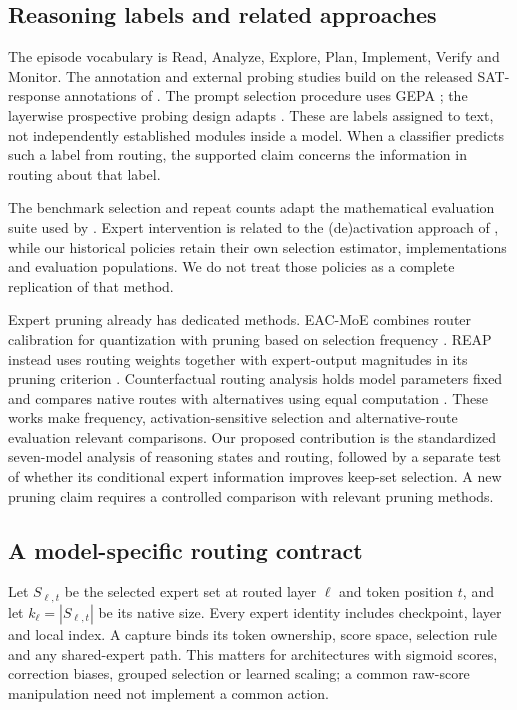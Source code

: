 \subsection{Reasoning labels and related approaches}
The episode vocabulary is Read, Analyze, Explore, Plan, Implement, Verify
and Monitor. The annotation and external probing studies build on the
released SAT-response annotations of \citet{li2025schoenfeld}. The prompt
selection procedure uses GEPA \citep{agrawal2026gepa}; the layerwise
prospective probing design adapts \citet{sun2026trajectories}. These are
labels assigned to text, not independently established modules inside a
model. When a classifier predicts such a label from routing, the supported
claim concerns the information in routing about that label.

The benchmark selection and repeat counts adapt the
mathematical evaluation suite used by \citet{liu2025spiral}.
Expert intervention is related to the (de)activation approach of
\citet{fayyaz2025steermoe}, while our historical policies retain their own
selection estimator, implementations and evaluation populations. We do
not treat those policies as a complete replication of that method.

Expert pruning already has dedicated methods. EAC-MoE combines router
calibration for quantization with pruning based on selection frequency
\citep{chen2025eac}. REAP instead uses routing weights together with
expert-output magnitudes in its pruning criterion \citep{lasby2026reap}.
Counterfactual routing analysis holds model parameters fixed and compares
native routes with alternatives using equal computation
\citep{yoon2026misrouted}. These works make frequency, activation-sensitive
selection and alternative-route evaluation relevant comparisons. Our
proposed contribution is the standardized seven-model analysis of
reasoning states and routing, followed by a separate test of whether its
conditional expert information improves keep-set selection. A new pruning
claim requires a controlled comparison with relevant pruning methods.

\subsection{A model-specific routing contract}
Let $S_{\ell,t}$ be the selected expert set at routed layer $\ell$ and token
position $t$, and let $k_\ell=|S_{\ell,t}|$ be its native size. Every expert
identity includes checkpoint, layer and local index. A capture binds its
token ownership, score space, selection rule and any shared-expert path.
This matters for architectures with sigmoid scores, correction biases,
grouped selection or learned scaling; a common raw-score manipulation need
not implement a common action.

